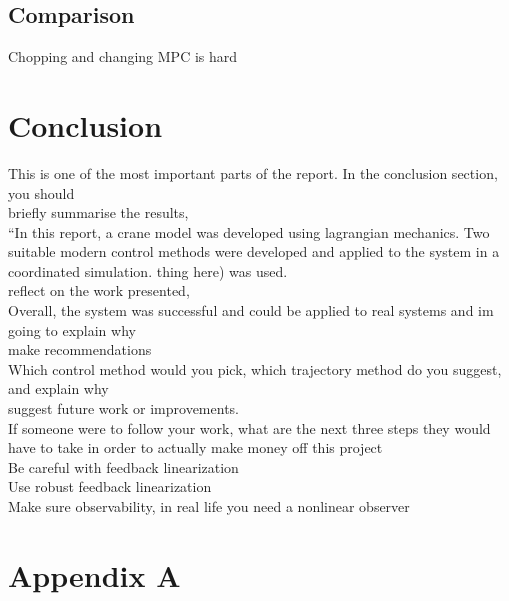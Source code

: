 \documentclass{UoNMCHA}
\numberwithin{equation}{section}
\begin{document}
	\subsection{Comparison}
	
	Chopping and changing MPC is hard
	
	\section{Conclusion}
	This is one of the most important parts of the report. In the conclusion section, you should \\
	briefly summarise the results,\\
	“In this report, a crane model was developed using lagrangian mechanics. Two suitable modern control methods were developed and applied to the system in a coordinated simulation. thing here) was used.\\  
	reflect on the work presented,\\
	Overall, the system was successful and could be applied to real systems and im going to explain why\\
	make recommendations\\
	Which control method would you pick, which trajectory method do you suggest, and explain why\\
	suggest future work or improvements.\\
	
	If someone were to follow your work, what are the next three steps they would have to take in order to actually make money off this project\\
	Be careful with feedback linearization\\
	Use robust feedback linearization\\
	Make sure observability, in real life you need a nonlinear observer\\
	
	
	\newpage
	\newpage
	\appendix
	
	\section{Appendix A}
	
\end{document}
